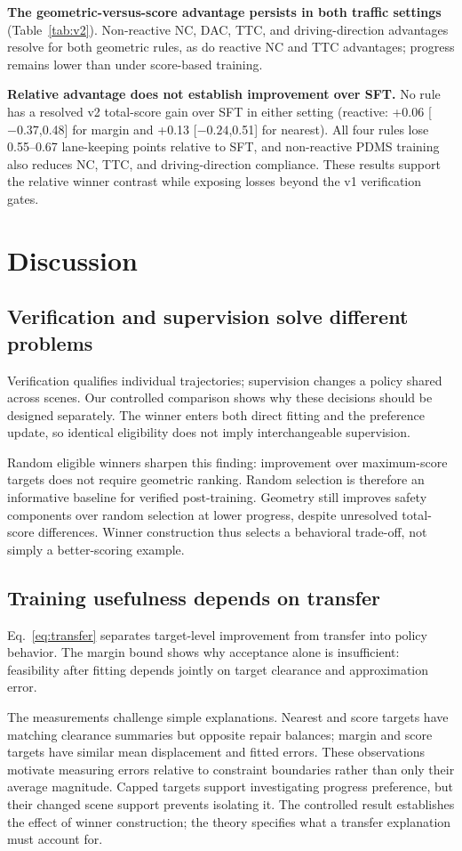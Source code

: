 \documentclass[letterpaper,10pt,conference]{ieeeconf}
\begin{document}
\textbf{The geometric-versus-score advantage persists in both traffic settings} (Table~\ref{tab:v2}). Non-reactive NC, DAC, TTC, and driving-direction advantages resolve for both geometric rules, as do reactive NC and TTC advantages; progress remains lower than under score-based training.

\textbf{Relative advantage does not establish improvement over SFT.} No rule has a resolved v2 total-score gain over SFT in either setting (reactive: +0.06 [$-0.37$,0.48] for margin and +0.13 [$-0.24$,0.51] for nearest). All four rules lose 0.55--0.67 lane-keeping points relative to SFT, and non-reactive PDMS training also reduces NC, TTC, and driving-direction compliance. These results support the relative winner contrast while exposing losses beyond the v1 verification gates.

\section{Discussion}
\subsection{Verification and supervision solve different problems}
Verification qualifies individual trajectories; supervision changes a policy shared across scenes. Our controlled comparison shows why these decisions should be designed separately. The winner enters both direct fitting and the preference update, so identical eligibility does not imply interchangeable supervision.

Random eligible winners sharpen this finding: improvement over maximum-score targets does not require geometric ranking. Random selection is therefore an informative baseline for verified post-training. Geometry still improves safety components over random selection at lower progress, despite unresolved total-score differences. Winner construction thus selects a behavioral trade-off, not simply a better-scoring example.

\subsection{Training usefulness depends on transfer}
Eq.~\eqref{eq:transfer} separates target-level improvement from transfer into policy behavior. The margin bound shows why acceptance alone is insufficient: feasibility after fitting depends jointly on target clearance and approximation error.

The measurements challenge simple explanations. Nearest and score targets have matching clearance summaries but opposite repair balances; margin and score targets have similar mean displacement and fitted errors. These observations motivate measuring errors relative to constraint boundaries rather than only their average magnitude. Capped targets support investigating progress preference, but their changed scene support prevents isolating it. The controlled result establishes the effect of winner construction; the theory specifies what a transfer explanation must account for.
\end{document}
